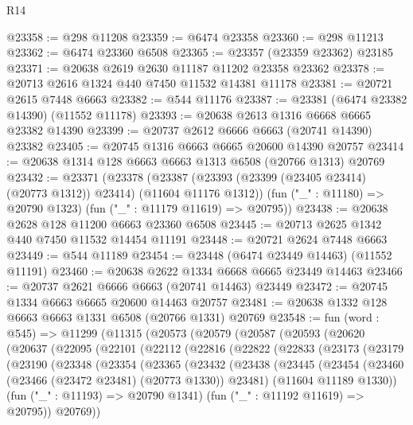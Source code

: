 \begin{lexlean}{R14}
\begin{coremodule}
@23358 := @298 @11208
@23359 := @6474 @23358
@23360 := @298 @11213
@23362 := @6474 @23360 @6508
@23365 := @23357 (@23359 @23362) @23185
@23371 := @20638 @2619 @2630 @11187 @11202 @23358 @23362
@23378 := @20713 @2616 @1324 @440 @7450 @11532 @14381 @11178
@23381 := @20721 @2615 @7448 @6663
@23382 := @544 @11176
@23387 := @23381 (@6474 @23382 @14390) (@11552 @11178)
@23393 := @20638 @2613 @1316 @6668 @6665 @23382 @14390
@23399 := @20737 @2612 @6666 @6663 (@20741 @14390) @23382
@23405 := @20745 @1316 @6663 @6665 @20600 @14390 @20757
@23414 := @20638 @1314 @128 @6663 @6663 @1313 @6508 (@20766 @1313) @20769
@23432 := @23371
    (@23378
      (@23387 (@23393 (@23399 (@23405 @23414) (@20773 @1312)) @23414) (@11604 @11176 @1312))
      (fun ("_" : @11180) => @20790 @1323)
      (fun ("_" : @11179 @11619) => @20795))
@23438 := @20638 @2628 @128 @11200 @6663 @23360 @6508
@23445 := @20713 @2625 @1342 @440 @7450 @11532 @14454 @11191
@23448 := @20721 @2624 @7448 @6663
@23449 := @544 @11189
@23454 := @23448 (@6474 @23449 @14463) (@11552 @11191)
@23460 := @20638 @2622 @1334 @6668 @6665 @23449 @14463
@23466 := @20737 @2621 @6666 @6663 (@20741 @14463) @23449
@23472 := @20745 @1334 @6663 @6665 @20600 @14463 @20757
@23481 := @20638 @1332 @128 @6663 @6663 @1331 @6508 (@20766 @1331) @20769
@23548 := fun (word : @545) =>
  @11299
    (@11315
      (@20573
        (@20579
          (@20587
            (@20593
              (@20620
                (@20637
                  (@22095
                    (@22101
                      (@22112
                        (@22816
                          (@22822
                            (@22833
                              (@23173
                                (@23179
                                  (@23190
                                    (@23348
                                      (@23354
                                        (@23365
                                          (@23432
                                            (@23438
                                              (@23445
                                                (@23454
                                                  (@23460
                                                    (@23466 (@23472 @23481) (@20773 @1330))
                                                    @23481)
                                                  (@11604 @11189 @1330))
                                                (fun ("_" : @11193) => @20790 @1341)
                                                (fun ("_" : @11192 @11619) => @20795))
                                              @20769))

\end{coremodule}
\end{lexlean}
